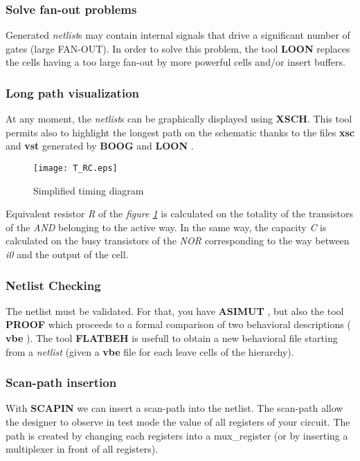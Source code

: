 \documentclass{article}
\begin{document}
{\subsubsection{Solve fan-out problems }
    Generated { \it netlist}\/s may contain internal signals that drive a
    significant number of gates (large FAN-OUT).
    In order to solve this problem, the tool
    { \bf LOON } replaces the cells having a too large fan-out by more powerful
    cells and/or insert buffers.

\subsubsection{Long path visualization }
    At any moment, the { \it netlist}\/s can be graphically displayed using {\bf XSCH}.
This tool permits also to highlight the longest path on the schematic thanks to the files { \bf
xsc } and { \bf vst } generated by { \bf BOOG } and { \bf LOON }.

\begin{figure}[H]\centering
  \texttt{[image: T\_RC.eps]}
 \caption{Simplified timing diagram }
  \label{Fig:T_RC}
\end{figure}

Equivalent resistor { \it R } of the { \it figure \ref{Fig:T_RC} }
is calculated on the totality of the transistors of the { \it AND
} belonging to the active way. In the same way, the capacity { \it
C } is calculated on the busy transistors of the { \it NOR }
corresponding to the way between { \it i0 } and the output of the
cell.

\subsubsection{Netlist Checking}
    The netlist must be validated. For that, you have { \bf ASIMUT },
    but also the tool { \bf PROOF } which proceeds to a formal comparison of two behavioral
    descriptions ({ \bf vbe }). The tool { \bf FLATBEH } is usefull to obtain a
    new behavioral file starting from a { \it netlist } 
   (given a {\bf vbe} file for each leave cells of the hierarchy).

\subsubsection{Scan-path insertion}
    With { \bf SCAPIN } we can insert a scan-path into the netlist.
    The scan-path allow the designer to observe in test mode the value of all registers of your circuit. 
    The path is created by changing each registers into a mux\_register (or by inserting a multiplexer
    in front of all registers).

}
\end{document}
